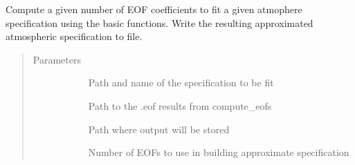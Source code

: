 \documentclass[letterpaper,10pt,english]{sphinxmanual}
\begin{document}
\begin{fulllineitems}
\label{\detokenize{stochprop.eofs:stochprop.eofs.fit_atmo}}
Compute a given number of EOF coefficients to fit a given
atmophere specification using the basic functions.  Write
the resulting approximated atmospheric specification to
file.
\begin{quote}\begin{description}
\item[{Parameters}] \leavevmode\begin{description}
\item[{}] \leavevmode
Path and name of the specification to be fit

\item[{}] \leavevmode
Path to the .eof results from compute\_eofs

\item[{}] \leavevmode
Path where output will be stored

\item[{}] \leavevmode
Number of EOFs to use in building approximate specification

\end{description}

\end{description}\end{quote}

\end{fulllineitems}

\end{document}
